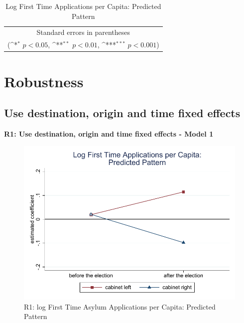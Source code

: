 \documentclass[10pt,a4paper]{scrartcl}
\begin{document}
\begin{table}[!ht]\centering
	\footnotesize
	\renewcommand{\arraystretch}{1.2}
	\def\sym#1{\ifmmode^{#1}\else\(^{#1}\)\fi}
	\caption{Log First Time Applications per Capita: Predicted Pattern}
	\begin{tabular}{l*{2}{c}}
		\hline\hline
		
		\hline\hline
		\multicolumn{3}{c}{\footnotesize Standard errors in parentheses} \\
		\multicolumn{3}{c}{\footnotesize (\sym{*} \(p<0.05\), \sym{**} \(p<0.01\), \sym{***} \(p<0.001\))}\\
	\end{tabular}
\end{table}



\FloatBarrier
\clearpage
\section{Robustness}

\subsection{Use destination, origin and time fixed effects}
\textbf{ R1: Use destination, origin and time fixed effects - Model 1}

\begin{figure}[!ht]
	\centering
	\includegraphics[width=1\textwidth]{figures_edited/app_graph1_R1.pdf}
	\caption{R1: log First Time Asylum Applications per Capita: Predicted Pattern}
\end{figure}
\end{document}
